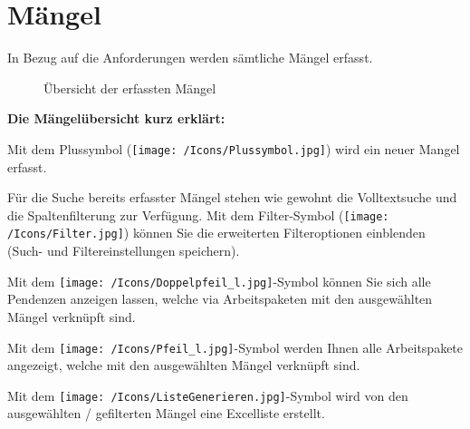 


\section{Mängel}

In Bezug auf die Anforderungen werden sämtliche Mängel erfasst. 

\begin{figure}[H]
\caption{Übersicht der erfassten Mängel}
\end{figure}

\textbf{Die Mängelübersicht kurz erklärt:}

\vspace{\baselineskip}

\begin{compactitem}
	\item Mit dem Plussymbol (\texttt{[image: /Icons/Plussymbol.jpg]}) wird ein neuer Mangel erfasst. 
	\item Für die Suche bereits erfasster Mängel stehen wie gewohnt die Volltextsuche und die Spaltenfilterung zur Verfügung. Mit dem Filter-Symbol (\texttt{[image: /Icons/Filter.jpg]}) können Sie die erweiterten Filteroptionen einblenden (Such- und Filtereinstellungen speichern).
	\item Mit dem \texttt{[image: /Icons/Doppelpfeil\_l.jpg]}-Symbol können Sie sich alle Pendenzen anzeigen lassen, welche via Arbeitspaketen mit den ausgewählten Mängel verknüpft sind.
	\item Mit dem \texttt{[image: /Icons/Pfeil\_l.jpg]}-Symbol werden Ihnen alle Arbeitspakete angezeigt, welche mit den ausgewählten Mängel verknüpft sind.
	\item Mit dem \texttt{[image: /Icons/ListeGenerieren.jpg]}-Symbol wird von den ausgewählten / gefilterten Mängel eine Excelliste erstellt.
\end{compactitem}

